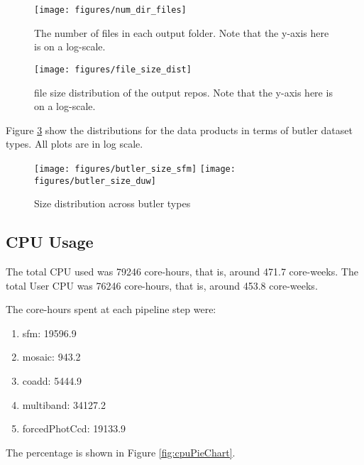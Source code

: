\documentclass[DM,authoryear,toc]{lsstdoc}
\begin{document}
\begin{figure}[htbp]
        \begin{center}
                 \texttt{[image: figures/num\_dir\_files]}
                 \caption{The number of files in each output folder. Note that the y-axis here is on a log-scale.}
                 \label{fig:num_dir_files}
        \end{center}
\end{figure}

\begin{figure}[htbp]
        \begin{center}
                 \texttt{[image: figures/file\_size\_dist]}
                 \caption{file size distribution of the output repos. Note that the y-axis here is on a log-scale.}
                 \label{fig:file_size_dist}
        \end{center}
\end{figure}

Figure \ref{fig:butler_size} show the distributions for the data products in terms of butler dataset types.  All plots are in log scale.

\begin{figure}[htbp]
        \begin{center}
                 \texttt{[image: figures/butler\_size\_sfm]}
                 \texttt{[image: figures/butler\_size\_duw]}
                 \caption{Size distribution across butler types}
                 \label{fig:butler_size}
        \end{center}
\end{figure}

\subsection{CPU Usage}

The total CPU used was 79246 core-hours, that is, around 471.7 core-weeks.
The total User CPU was 76246 core-hours, that is, around 453.8 core-weeks.

The core-hours spent at each pipeline step were:
\begin{enumerate}
\item
sfm: 19596.9
\item
mosaic: 943.2
\item
coadd: 5444.9
\item
multiband: 34127.2
\item
forcedPhotCcd: 19133.9
\end{enumerate}
The percentage is shown in Figure \ref{fig:cpuPieChart}.
\end{document}
